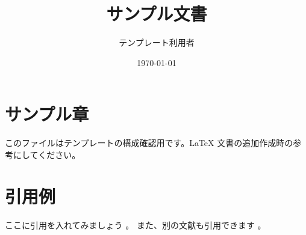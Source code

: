 \documentclass[a4paper,11pt]{article}
\title{サンプル文書}
\author{テンプレート利用者}
\date{\today}
\begin{document}
\maketitle
\tableofcontents
\clearpage

\section{サンプル章}
このファイルはテンプレートの構成確認用です。\LaTeX{} 文書の追加作成時の参考にしてください。

\section{引用例}
ここに引用を入れてみましょう \cite{example2024}。
また、別の文献も引用できます \cite{examplebook2024}。



\end{document}
